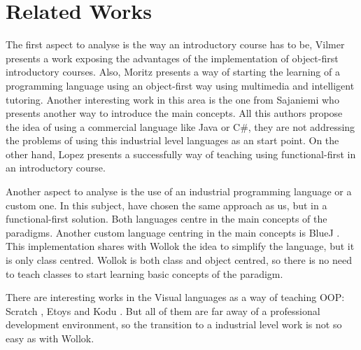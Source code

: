\section{Related Works}
\label{sec:related}




The first aspect to analyse is the way an introductory course has to be,
Vilmer \etal \cite{vilner_2007} presents a work exposing the advantages of the implementation of object-first introductory courses. 
Also, Moritz \etal \cite{moritz_2005} presents a way of starting the learning of a programming language using an object-first way using multimedia and intelligent tutoring.
Another interesting work in this area is the one from Sajaniemi \etal \cite{Sajaniemi_teachingprogramming:} who presents another way to introduce the main concepts.
All this authors propose the idea of using a commercial language like Java or C\#, they are not addressing the problems of using this industrial level languages as an start point.
On the other hand, Lopez \etal \cite{lopez_nombre_2012} presents a successfully way of teaching using functional-first in an introductory course. 

Another aspect to analyse is the use of an industrial programming language or a custom one. 
In this subject, \cite{lopez_nombre_2012} \etal have chosen the same approach as us, but in a functional-first solution. Both languages centre in the main concepts of the paradigms. 
Another custom language centring in the main concepts is BlueJ \cite{bennedsen_bluej_2010}. This implementation shares with Wollok the idea to simplify the language, but it is only class centred. Wollok is both class and object centred, so there is no need to teach classes to start learning basic concepts of the paradigm.

There are interesting works in the Visual languages as a way of teaching OOP: Scratch \cite{malan_scratch_2007}, Etoys \cite{lee_empowering_2011} and Kodu \cite{kodu}. But all of them are far away of a professional development environment, so the transition to a industrial level work is not so easy as with Wollok.
